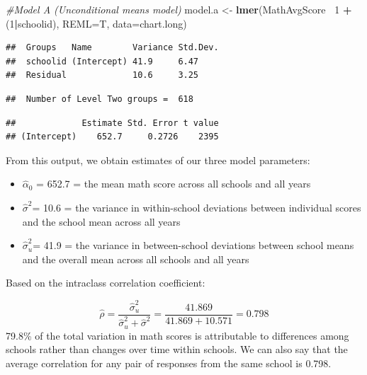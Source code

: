\documentclass[
]{krantz}
\newenvironment{Shaded}{\begin{snugshade}}{\end{snugshade}}
\newcommand{\CommentTok}[1]{\textcolor[rgb]{0.37,0.37,0.37}{\textit{#1}}}
\newcommand{\DataTypeTok}[1]{\textcolor[rgb]{0.27,0.27,0.27}{#1}}
\newcommand{\DecValTok}[1]{\textcolor[rgb]{0.06,0.06,0.06}{#1}}
\newcommand{\KeywordTok}[1]{\textcolor[rgb]{0.27,0.27,0.27}{\textbf{#1}}}
\newcommand{\NormalTok}[1]{#1}
\newcommand{\OperatorTok}[1]{\textcolor[rgb]{0.43,0.43,0.43}{\textbf{#1}}}
\newcommand{\StringTok}[1]{\textcolor[rgb]{0.5,0.5,0.5}{#1}}
\begin{document}
\begin{Shaded}
\begin{Highlighting}[]
\CommentTok{#Model A (Unconditional means model)}
\NormalTok{model.a <-}\StringTok{ }\KeywordTok{lmer}\NormalTok{(MathAvgScore}\OperatorTok{~}\StringTok{ }\DecValTok{1} \OperatorTok{+}\StringTok{ }\NormalTok{(}\DecValTok{1}\OperatorTok{|}\NormalTok{schoolid), }
                \DataTypeTok{REML=}\NormalTok{T, }\DataTypeTok{data=}\NormalTok{chart.long)}
\end{Highlighting}
\end{Shaded}

\begin{verbatim}
##  Groups   Name        Variance Std.Dev.
##  schoolid (Intercept) 41.9     6.47    
##  Residual             10.6     3.25
\end{verbatim}

\begin{verbatim}
##  Number of Level Two groups =  618
\end{verbatim}

\begin{verbatim}
##             Estimate Std. Error t value
## (Intercept)    652.7     0.2726    2395
\end{verbatim}

From this output, we obtain estimates of our three model parameters:

\begin{itemize}
\item
  \(\hat{\alpha}_{0}\) = 652.7 = the mean math score across all schools and all years
\item
  \(\hat{\sigma}^2\)= 10.6 = the variance in within-school deviations between individual scores and the school mean across all years
\item
  \(\hat{\sigma}^2_u\)= 41.9 = the variance in between-school deviations between school means and the overall mean across all schools and all years
\end{itemize}

Based on the intraclass correlation coefficient:

\begin{equation*}
\hat{\rho}=\frac{\hat{\sigma}^2_u}{\hat{\sigma}^2_u + \hat{\sigma}^2} = \frac{41.869}{41.869+10.571}= 0.798
\end{equation*}
79.8\% of the total variation in math scores is attributable to differences among schools rather than changes over time within schools. We can also say that the average correlation for any pair of responses from the same school is 0.798.
\end{document}

